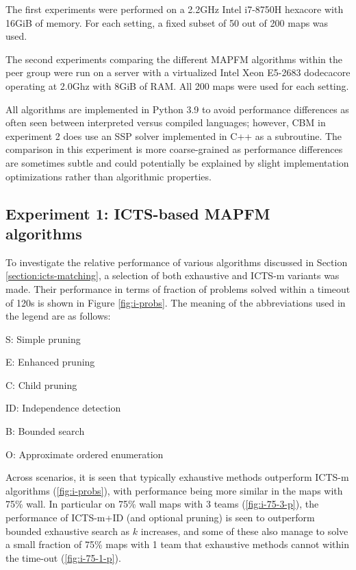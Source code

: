\documentclass[english]{article}
\begin{document}
	The first experiments were performed on a 2.2GHz Intel i7-8750H hexacore with 16GiB of memory. For each setting, a fixed subset of 50 out of 200 maps was used. %
	
	The second experiments comparing the different MAPFM algorithms within the peer group were run on a server with a virtualized Intel Xeon E5-2683 dodecacore operating at 2.0Ghz with 8GiB of RAM. All 200 maps were used for each setting.
	
	All algorithms are implemented in Python 3.9 to avoid performance differences as often seen between interpreted versus compiled languages; however, CBM\cite{baauw2021} in experiment 2 does use an SSP solver implemented in C++ as a subroutine. The comparison in this experiment is more coarse-grained as performance differences are sometimes subtle and could potentially be explained by slight implementation optimizations rather than algorithmic properties.
	
	\subsection{Experiment 1: ICTS-based MAPFM algorithms}
	To investigate the relative performance of various algorithms discussed in Section \ref{section:icts-matching}, a selection of both exhaustive and ICTS-m variants was made. Their performance in terms of fraction of problems solved within a timeout of 120s is shown in Figure \ref{fig:i-probs}. The meaning of the abbreviations used in the legend are as follows:
	\begin{itemize}
		\begin{minipage}{0.45\linewidth}
			\item S: Simple pruning
			\item E: Enhanced pruning
			\item C: Child pruning
		\end{minipage}
		\begin{minipage}{0.45\linewidth}
			\item ID: Independence detection
			\item B: Bounded search
			\item O: Approximate ordered enumeration
		\end{minipage}
	\end{itemize}
	Across scenarios, it is seen that typically exhaustive methods outperform ICTS-m algorithms (\ref{fig:i-probs}), with performance being more similar in the maps with 75\% wall. In particular on 75\% wall maps with 3 teams (\ref{fig:i-75-3-p}), the performance of ICTS-m+ID (and optional pruning) is seen to outperform bounded exhaustive search as $k$ increases, and some of these also manage to solve a small fraction of 75\% maps with 1 team that exhaustive methods cannot within the time-out (\ref{fig:i-75-1-p}).
	
\end{document}
